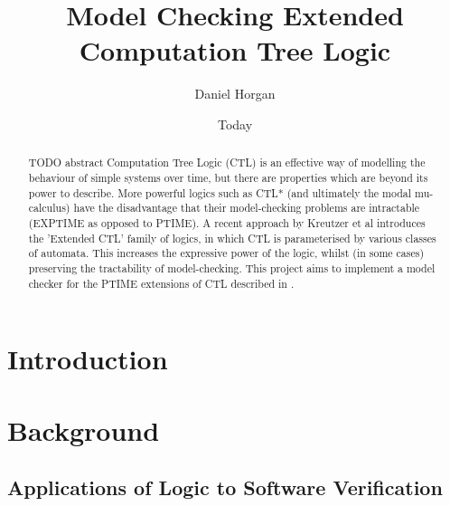 \documentclass[11pt]{article}
\begin{document}
\title{Model Checking Extended Computation Tree Logic}
\author{Daniel Horgan}
\date{Today}
\maketitle

\begin{comment}
[scratch]
Blablabla said Nobody ~\cite{Nobody06}.
\end{comment}

\begin{abstract}

TODO abstract
Computation Tree Logic (CTL) is an effective way of modelling the behaviour of
simple systems over time, but there are properties which are beyond its power
to describe. More powerful logics such as CTL* (and ultimately the modal
mu-calculus) have the disadvantage that their model-checking problems are
intractable (EXPTIME as opposed to PTIME). A recent approach by Kreutzer et al
\cite{Kreutzer10} introduces the 'Extended CTL' family of logics, in which CTL
is parameterised by various classes of automata. This increases the expressive
power of the logic, whilst (in some cases) preserving the tractability of
model-checking. This project aims to implement a model checker for the PTIME
extensions of CTL described in \cite{Kreutzer10}.

\end{abstract}

\tableofcontents
\setcounter{tocdepth}{3}


\section{Introduction}



\section{Background}

\subsection{Applications of Logic to Software Verification}
\end{document}
